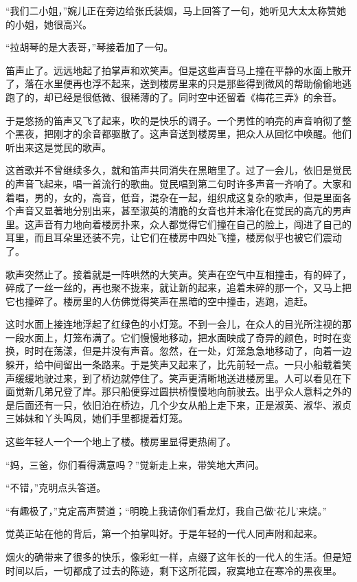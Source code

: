 \par “我们二小姐，”婉儿正在旁边给张氏装烟，马上回答了一句，她听见大太太称赞她的小姐，她很高兴。
\par “拉胡琴的是大表哥，”琴接着加了一句。
\par 笛声止了。远远地起了拍掌声和欢笑声。但是这些声音马上撞在平静的水面上散开了，落在水里便再也浮不起来，送到楼房里来的只是那些得到微风的帮助偷偷地逃跑了的，却已经是很低微、很稀薄的了。同时空中还留着《梅花三弄》的余音。
\par 于是悠扬的笛声又飞了起来，吹的是快乐的调子。一个男性的响亮的声音响彻了整个黑夜，把刚才的余音都驱散了。这声音送到楼房里，把众人从回忆中唤醒。他们听出来这是觉民的歌声。
\par 这首歌并不曾继续多久，就和笛声共同消失在黑暗里了。过了一会儿，依旧是觉民的声音飞起来，唱一首流行的歌曲。觉民唱到第二句时许多声音一齐响了。大家和着唱，男的，女的，高音，低音，混杂在一起，组织成这复杂的歌声，但是里面各个声音又显著地分别出来，甚至淑英的清脆的女音也并未溶化在觉民的高亢的男声里。这声音有力地向着楼房扑来，众人都觉得它们撞在自己的脸上，闯进了自己的耳里，而且耳朵里还装不完，让它们在楼房中四处飞撞，楼房似乎也被它们震动了。
\par 歌声突然止了。接着就是一阵哄然的大笑声。笑声在空气中互相撞击，有的碎了，碎成了一丝一丝的，再也聚不拢来，就让新的起来，追着未碎的那一个，又马上把它也撞碎了。楼房里的人仿佛觉得笑声在黑暗的空中撞击，逃跑，追赶。
\par 这时水面上接连地浮起了红绿色的小灯笼。不到一会儿，在众人的目光所注视的那一段水面上，灯笼布满了。它们慢慢地移动，把水面映成了奇异的颜色，时时在变换，时时在荡漾，但是并没有声音。忽然，在一处，灯笼急急地移动了，向着一边躲开，给中间留出一条路来。于是笑声又起来了，比先前轻一点。一只小船载着笑声缓缓地驶过来，到了桥边就停住了。笑声更清晰地送进楼房里。人可以看见在下面觉新几弟兄登了岸。那只船便穿过圆拱桥慢慢地向前驶去。出乎众人意料之外的是后面还有一只，依旧泊在桥边，几个少女从船上走下来，正是淑英、淑华、淑贞三姊妹和丫头鸣凤，她们手里都提着灯笼。
\par 这些年轻人一个一个地上了楼。楼房里显得更热闹了。
\par “妈，三爸，你们看得满意吗？”觉新走上来，带笑地大声问。
\par “不错，”克明点头答道。
\par “有趣极了，”克定高声赞道；“明晚上我请你们看龙灯，我自己做‘花儿’来烧。”
\par 觉英正站在他的背后，第一个拍掌叫好。于是年轻的一代人同声附和起来。
\par 烟火的确带来了很多的快乐，像彩虹一样，点缀了这年长的一代人的生活。但是短时间以后，一切都成了过去的陈迹，剩下这所花园，寂寞地立在寒冷的黑夜里。


